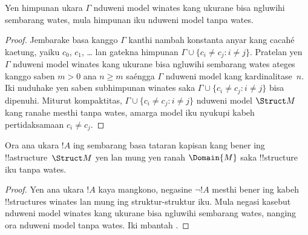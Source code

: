 \documentclass[../../../include/open-logic-section]{subfiles}
\begin{document}

\begin{thm}
 Yen himpunan ukara $\Gamma$
nduweni model winates kang ukurane bisa
ngluwihi sembarang wates, mula himpunan
iku nduweni model tanpa wates.
\end{thm}

\begin{proof}
Jembarake basa kanggo $\Gamma$ kanthi
nambah konstanta anyar kang cacahé
kaetung, yaiku $c_0$, $c_1$, \dots
lan gatekna himpunan $\Gamma \cup \{c_i \neq c_j :
i \neq j\}$. Pratelan yen $\Gamma$
nduweni model winates kang ukurane
bisa ngluwihi sembarang wates
ateges kanggo saben $m >0$
ana $n\ge m$ saéngga $\Gamma$
nduweni model kang kardinalitase~$n$.
Iki nuduhake yen saben subhimpunan
winates saka $\Gamma \cup \{c_i \neq
c_j : i \neq j\}$ bisa dipenuhi.
Miturut kompaktitas, $\Gamma
\cup \{c_i \neq c_j : i \neq j\}$
nduweni model $\Struct M$
kang ranahe mesthi tanpa wates,
amarga model iku nyukupi
kabeh pertidaksamaan $c_i \neq c_j$.
\end{proof}

\begin{prop}
Ora ana ukara $!A$ ing sembarang
basa tataran kapisan kang bener ing
!!a{structure}~$\Struct M$
yen lan mung yen ranah
$\Domain{M}$ saka
!!{structure} iku tanpa wates.
\end{prop}

\begin{proof}
Yen ana ukara $!A$ kaya mangkono,
negasine $\lnot !A$ mesthi bener
ing kabeh !!{structure}s winates
lan mung ing struktur-struktur
iku. Mula negasi kasebut
nduweni model winates kang
ukurane bisa ngluwihi
sembarang wates, nanging
ora nduweni model tanpa
wates. Iki mbantah
.
\end{proof}
\end{document}
